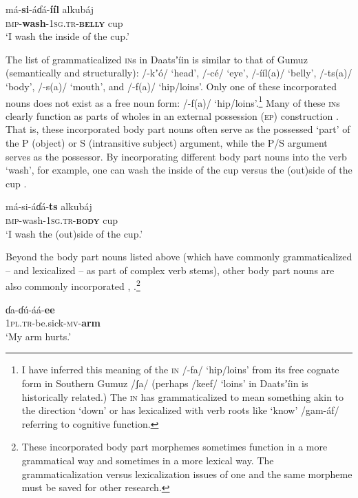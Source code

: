 \documentclass[output=paper]{langsci/langscibook}
\begin{document}
\ea\label{ex:ahlandc:11}
\gll 
má-\textbf{si}{}-áɗá-\textbf{ííl}  alkubáj \\
\textsc{imp}{}-\textbf{wash}{}-\textsc{1sg.tr-}\textbf{\textsc{belly}}     cup \\
\glt
‘I wash the inside of the cup.’
\z

The list of grammaticalized \textsc{in}s in Daatsʼíin is  similar to that of Gumuz (semantically and structurally): /-kʼ\'{o}/ ‘head’, /-cé/ ‘eye’, /-ííl(a)/ ‘belly’, /-ts(a)/ ‘body’, /-s(a)/ ‘mouth’, and /-f(a)/ ‘hip/loins’. Only one of these incorporated nouns does not exist as a free noun form: /-f(a)/ ‘hip/loins’.\footnote{ I have inferred this meaning of the \textsc{in }/-fa/ ‘hip/loins’ from its free cognate form in Southern Gumuz /ʃa/ (perhaps /keef/ ‘loins’ in Daatsʼíin is historically related.) The \textsc{in }has grammaticalized to mean something akin to the direction ‘down’ or has lexicalized with verb roots like ‘know’ /gam-\'{a}f/ referring to cognitive function.} Many of these \textsc{in}s clearly function as parts of wholes in an external possession (\textsc{ep}) construction \citep{PayneBarshi1999}. That is, these incorporated body part nouns often serve as the possessed ‘part’ of the P (object) or S (intransitive subject) argument, while the P/S argument serves as the possessor. By incorporating different body part nouns into the verb ‘wash’, for example, one can wash the inside of the cup  versus the (out)side of the cup .  

\ea\label{ex:ahlandc:12}
\gll
má-si-áɗá-\textbf{ts}    alkubáj \\
\textsc{imp}{}-wash{}-\textsc{1sg.tr-}\textbf{\textsc{body}}   cup \\
\glt
‘I wash the (out)side of the cup.’
\z

Beyond the body part nouns listed above (which have commonly grammaticalized – and lexicalized – as part of complex verb stems), other body part nouns are also commonly incorporated , .\footnote{These incorporated body part morphemes sometimes function in a more grammatical way and sometimes in a more lexical way. The grammaticalization versus lexicalization issues of one and the same morpheme must be saved for other research.}

\ea\label{ex:ahlandc:13}
\gll
ɗa-ɗ\'{u}-áá-\textbf{ee}   \\
\textsc{1pl.tr}{}-be.sick-\textsc{mv}{}-\textbf{arm} \\
\glt
‘My arm hurts.’
\z
\end{document}
